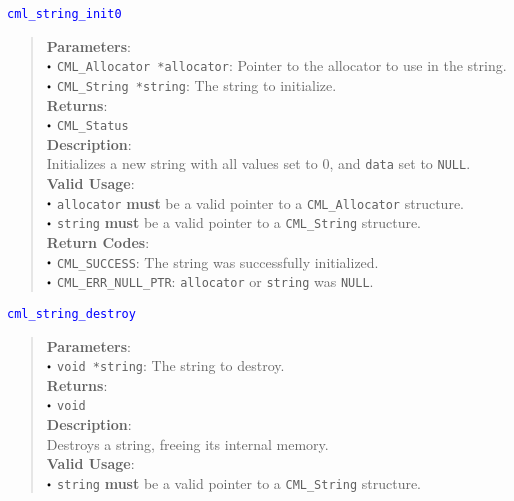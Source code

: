 \documentclass[a4paper,oneside,8pt]{extarticle}
\newcommand{\function}[1]{
  \noindent\textcolor{blue}{\texttt{#1}}
  \vspace{-0.3em}
}
\renewcommand{\dot}{\raisebox{0.3ex}{\scalebox{0.6}{$\bullet$}}}
\theoremstyle{definition}
\begin{document}
\function{cml\_string\_init0}
\begin{quote}
  \textbf{Parameters}: \\
  $\dot$ \texttt{CML\_Allocator *allocator}: Pointer to the allocator to use in the string. \\
  $\dot$ \texttt{CML\_String *string}: The string to initialize. \\
  \textbf{Returns}: \\
  $\dot$ \texttt{CML\_Status} \\
  
  \vspace{-0.75em}
  \textbf{Description}: \\
  Initializes a new string with all values set to 0, and \texttt{data} set to \texttt{NULL}. \\

  \vspace{-0.75em}
  \textbf{Valid Usage}: \\
  $\dot$ \texttt{allocator} \textbf{must} be a valid pointer to a \texttt{CML\_Allocator} structure. \\
  $\dot$ \texttt{string} \textbf{must} be a valid pointer to a \texttt{CML\_String} structure. \\

  \vspace{-0.75em}
  \textbf{Return Codes}: \\
  $\dot$ \texttt{CML\_SUCCESS}: The string was successfully initialized. \\
  $\dot$ \texttt{CML\_ERR\_NULL\_PTR}: \texttt{allocator} or \texttt{string} was \texttt{NULL}. \\
\end{quote}

\function{cml\_string\_destroy}
\begin{quote}
  \textbf{Parameters}: \\
  $\dot$ \texttt{void *string}: The string to destroy. \\
  \textbf{Returns}: \\
  $\dot$ \texttt{void} \\
  
  \vspace{-0.75em}
  \textbf{Description}: \\
  Destroys a string, freeing its internal memory. \\

  \vspace{-0.75em}
  \textbf{Valid Usage}: \\
  $\dot$ \texttt{string} \textbf{must} be a valid pointer to a \texttt{CML\_String} structure. \\
\end{quote}
\end{document}
